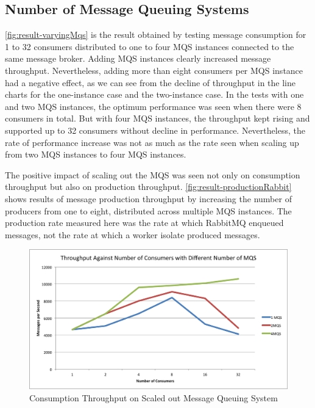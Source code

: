 \subsection{Number of Message Queuing Systems}
  \autoref{fig:result-varyingMqs} is the result obtained by testing message consumption for 1 to 32 consumers distributed to one to four MQS instances connected to the same message broker. Adding MQS instances clearly increased message throughput. Nevertheless, adding more than eight consumers per MQS instance had a negative effect, as we can see from the decline of throughput in the line charts for the one-instance case and the two-instance case. In the tests with one and two MQS instances, the optimum performance was seen when there were 8 consumers in total. But with four MQS instances, the throughput kept rising and supported up to 32 consumers without decline in performance. Nevertheless, the rate of performance increase was not as much as the rate seen when scaling up from two MQS instances to four MQS instances.

  The positive impact of scaling out the MQS was seen not only on consumption throughput but also on production throughput. \autoref{fig:result-productionRabbit} shows results of message production throughput by increasing the number of producers from one to eight, distributed across multiple MQS instances. The production rate measured here was the rate at which RabbitMQ enqueued messages, not the rate at which a worker isolate produced messages.
\begin{figure}[H]
  \centering
  \includegraphics[width=1\textwidth]{figures/04varyingMqs}
  \caption[Consumption Throughput on Scaled out Message Queuing System]{Consumption Throughput on Scaled out Message Queuing System}
  \label{fig:result-varyingMqs}
\end{figure}



